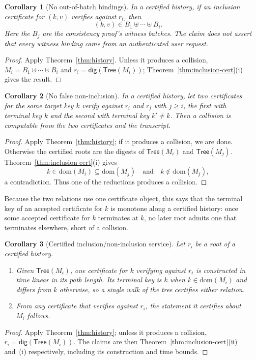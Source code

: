 \documentclass[twocolumn]{article}
\newtheorem{corollary}{Corollary}
\begin{document}
\begin{corollary}[No out-of-batch bindings]
\label{cor:batchbound}
In a certified history, if an inclusion certificate for $(k,v)$ verifies against $r_i$, then
\[
  (k,v)\in B_1\uplus\cdots\uplus B_i.
\]
Here the $B_j$ are the consistency proof's witness batches. The claim does not assert that every witness binding came from an authenticated user request.
\end{corollary}
\begin{proof}
Apply Theorem~\ref{thm:history}. Unless it produces a collision, $M_i=B_1\uplus\cdots\uplus B_i$ and $r_i=\mathsf{dig}(\mathsf{Tree}(M_i))$; Theorem~\ref{thm:inclusion-cert}(i) gives the result.
\end{proof}

\begin{corollary}[No false non-inclusion]
\label{cor:noninc}
In a certified history, let two certificates for the same target key $k$ verify against $r_i$ and $r_j$ with $j\geq i$, the first with terminal key $k$ and the second with terminal key $k'\neq k$. Then a collision is computable from the two certificates and the transcript.
\end{corollary}
\begin{proof}
Apply Theorem~\ref{thm:history}; if it produces a collision, we are done. Otherwise the certified roots are the digests of $\mathsf{Tree}(M_i)$ and $\mathsf{Tree}(M_j)$. Theorem~\ref{thm:inclusion-cert}(i) gives
\[
  k\in\mathrm{dom}(M_i)\subseteq\mathrm{dom}(M_j)
  \quad\text{and}\quad
  k\notin\mathrm{dom}(M_j),
\]
a contradiction. Thus one of the reductions produces a collision.
\end{proof}

Because the two relations use one certificate object, this says that the terminal key of an accepted certificate for $k$ is monotone along a certified history: once some accepted certificate for $k$ terminates at $k$, no later root admits one that terminates elsewhere, short of a collision.

\begin{corollary}[Certified inclusion/non-inclusion service]
\label{cor:service}
Let $r_i$ be a root of a certified history.
\begin{enumerate}[nosep,label=(\roman*)]
  \item Given $\mathsf{Tree}(M_i)$, one certificate for $k$ verifying against $r_i$ is constructed in time linear in its path length. Its terminal key is $k$ when $k\in\mathrm{dom}(M_i)$ and differs from $k$ otherwise, so a single walk of the tree certifies either relation.
  \item From any certificate that verifies against $r_i$, the statement it certifies about $M_i$ follows.
\end{enumerate}
\end{corollary}
\begin{proof}
Apply Theorem~\ref{thm:history}; unless it produces a collision, $r_i=\mathsf{dig}(\mathsf{Tree}(M_i))$. The claims are then Theorem~\ref{thm:inclusion-cert}(ii) and~(i) respectively, including its construction and time bounds.
\end{proof}
\end{document}

